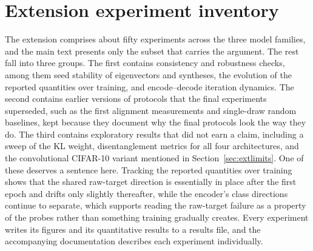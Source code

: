 \documentclass[10pt]{article} %
\begin{document}
\section{Extension experiment inventory}
\label{app:extinv}

The extension comprises about fifty experiments across the three model families,
and the main text presents only the subset that carries the argument. The rest
fall into three groups. The first contains consistency and robustness checks,
among them seed stability of eigenvectors and syntheses, the evolution of the
reported quantities over training, and encode--decode iteration dynamics. The
second contains earlier versions of protocols that the final experiments
superseded, such as the first alignment measurements and single-draw random
baselines, kept because they document why the final protocols look the way they
do. The third contains exploratory results that did not earn a claim, including a
sweep of the KL weight, disentanglement metrics for all four architectures, and
the convolutional CIFAR-10 variant mentioned in Section~\ref{sec:extlimits}. One
of these deserves a sentence here. Tracking the reported quantities over training
shows that the shared raw-target direction is essentially in place after the first
epoch and drifts only slightly thereafter, while the encoder's class directions
continue to separate, which supports reading the raw-target failure as a property
of the probes rather than something training gradually creates. Every experiment
writes its figures and its quantitative results to a results file, and the
accompanying documentation describes each experiment individually.
\end{document}
